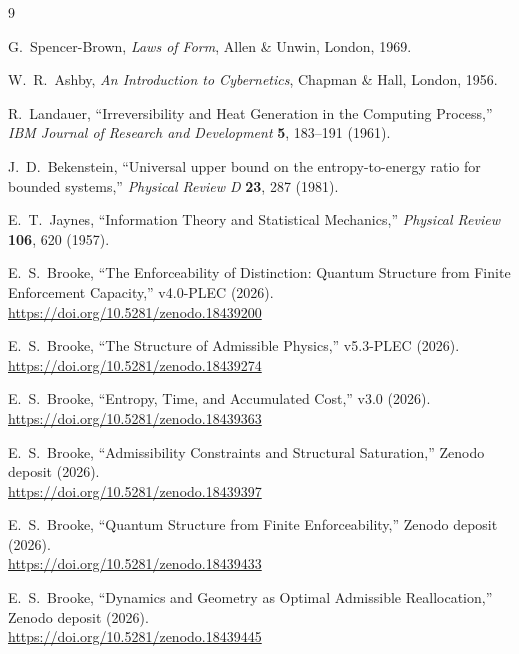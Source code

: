\documentclass[11pt]{article}
\begin{document}
\begin{thebibliography}{9}

G.\ Spencer-Brown, \emph{Laws of Form}, Allen \& Unwin, London, 1969.

W.\ R.\ Ashby, \emph{An Introduction to Cybernetics}, Chapman \& Hall, London, 1956.

R.\ Landauer, ``Irreversibility and Heat Generation in the Computing Process,''
\emph{IBM Journal of Research and Development} \textbf{5}, 183--191 (1961).

J.\ D.\ Bekenstein, ``Universal upper bound on the entropy-to-energy ratio for bounded systems,''
\emph{Physical Review D} \textbf{23}, 287 (1981).

E.\ T.\ Jaynes, ``Information Theory and Statistical Mechanics,''
\emph{Physical Review} \textbf{106}, 620 (1957).

E.\ S.\ Brooke, ``The Enforceability of Distinction: Quantum Structure from Finite Enforcement Capacity,''
v4.0-PLEC (2026). \\
\url{https://doi.org/10.5281/zenodo.18439200}

E.\ S.\ Brooke, ``The Structure of Admissible Physics,''
v5.3-PLEC (2026). \\
\url{https://doi.org/10.5281/zenodo.18439274}

E.\ S.\ Brooke, ``Entropy, Time, and Accumulated Cost,''
v3.0 (2026). \\
\url{https://doi.org/10.5281/zenodo.18439363}

E.\ S.\ Brooke, ``Admissibility Constraints and Structural Saturation,''
Zenodo deposit (2026). \\
\url{https://doi.org/10.5281/zenodo.18439397}

E.\ S.\ Brooke, ``Quantum Structure from Finite Enforceability,''
Zenodo deposit (2026). \\
\url{https://doi.org/10.5281/zenodo.18439433}

E.\ S.\ Brooke, ``Dynamics and Geometry as Optimal Admissible Reallocation,''
Zenodo deposit (2026). \\
\url{https://doi.org/10.5281/zenodo.18439445}


\end{thebibliography}
\end{document}
